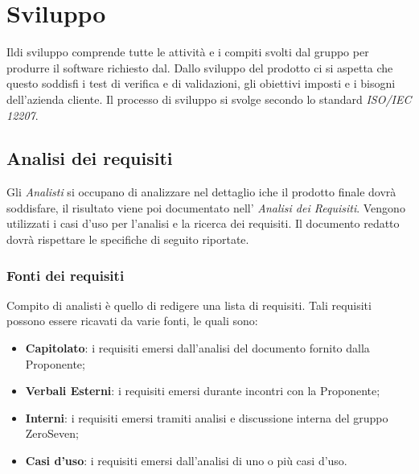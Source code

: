 
\section{Sviluppo}
Ildi sviluppo comprende tutte le attività e i compiti svolti dal gruppo per produrre il software richiesto dal. Dallo sviluppo del prodotto ci si aspetta che questo soddisfi i test di verifica e di validazioni, gli obiettivi imposti e i bisogni dell'azienda cliente. Il processo di sviluppo si svolge secondo lo standard \textit{ISO/IEC 12207}.
\subsection{Analisi dei requisiti}
Gli \textit{Analisti} si occupano di analizzare nel dettaglio iche il prodotto finale dovrà soddisfare, il risultato viene poi documentato nell' \textit{Analisi dei Requisiti}. Vengono utilizzati i casi d'uso per l'analisi e la ricerca dei requisiti.
Il documento redatto dovrà rispettare le specifiche di seguito riportate.
\subsubsection{Fonti dei requisiti}
Compito di analisti è quello di redigere una lista di requisiti. Tali requisiti possono essere ricavati da varie fonti, le quali sono:
\begin{itemize}
	\item \textbf{Capitolato}: i requisiti emersi dall'analisi del documento fornito dalla Proponente;
	\item \textbf{Verbali Esterni}: i requisiti emersi durante incontri con la Proponente;
	\item \textbf{Interni}: i requisiti emersi tramiti analisi e discussione interna del gruppo ZeroSeven;
	\item \textbf{Casi d'uso}: i requisiti emersi dall'analisi di uno o più casi d'uso.
\end{itemize}
